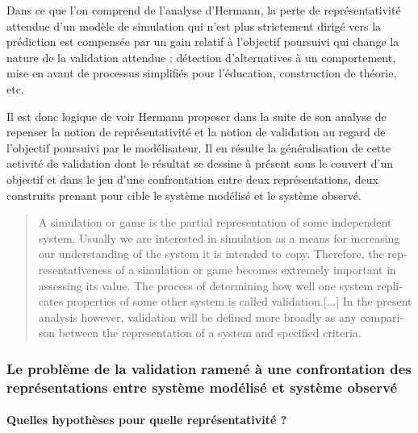 Dans ce que l'on comprend de l'analyse d'Hermann, la perte de représentativité attendue d'un modèle de simulation qui n'est plus strictement dirigé vers la prédiction est compensée par un gain relatif à l'objectif poursuivi qui change la nature de la validation attendue : détection d'alternatives à un comportement, mise en avant de processus simplifiés pour l'éducation, construction de théorie, etc.

Il est donc logique de voir Hermann proposer dans la suite de son analyse de repenser la notion de représentativité et la notion de validation au regard de l'objectif poursuivi par le modélisateur. Il en résulte la généralisation de cette activité de validation dont le résultat se dessine à présent sous le couvert d'un objectif et dans le jeu d'une confrontation entre deux représentations, deux construits prenant pour cible le système modélisé et le système observé.

\foreignblockquote{english}[{\cite[216]{Hermann1967}}]{A simulation or game is the partial representation of some independent system. Usually we are interested in simulation as a means for increasing our understanding of the system it is intended to copy. Therefore, the representativeness of a simulation or game becomes extremely important in assessing its value. The process of determining how well one system replicates properties of some other system is called validation.[...] In the present analysis however, validation will be defined more broadly as any comparison between the representation of a system and specified criteria.}

\subsubsection{Le problème de la validation ramené à une confrontation des représentations entre système modélisé et système observé}
\label{sssec:confrontation_sysmodelise_sysobserve}


\paragraph{Quelles hypothèses pour quelle représentativité ?}
\label{p:hypothese_representativite}

